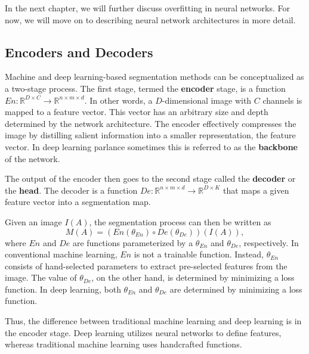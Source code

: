 In the next chapter, we will further discuss overfitting in neural networks. For now, we will move on to describing neural network architectures in more detail.

\subsection{Encoders and Decoders}

Machine and deep learning-based segmentation methods can be conceptualized as a two-stage process. The first stage, termed the \textbf{encoder} stage, is a function $En : \mathbb{R}^{D \times C} \rightarrow \mathbb{R}^{n \times m \times d}$. In other words, a $D$-dimensional image with $C$ channels is mapped to a feature vector. This vector has an arbitrary size and depth determined by the network architecture. The encoder effectively compresses the image by distilling salient information into a smaller representation, the feature vector. In deep learning parlance sometimes this is referred to as the \textbf{backbone} of the network.

The output of the encoder then goes to the second stage called the \textbf{decoder} or the \textbf{head}. The decoder is a function $De : \mathbb{R}^{n \times m \times d} \rightarrow \mathbb{R}^{D \times K}$ that maps a given feature vector into a segmentation map. 

Given an image $I(A)$, the segmentation process can then be written as
\begin{equation}
M(A) = (En(\theta_{En}) \circ De(\theta_{De}))(I(A)),
\end{equation}
where $En$ and $De$ are functions parameterized by a $\theta_{En}$ and $\theta_{De}$, respectively. In conventional machine learning, $En$ is not a trainable function. Instead, $\theta_{En}$ consists of hand-selected parameters to extract pre-selected features from the image. The value of $\theta_{De}$, on the other hand, is determined by minimizing a loss function. In deep learning, both $\theta_{En}$ and $\theta_{De}$ are determined by minimizing a loss function.

Thus, the difference between traditional machine learning and deep learning is in the encoder stage. Deep learning utilizes neural networks to define features, whereas traditional machine learning uses handcrafted functions.

